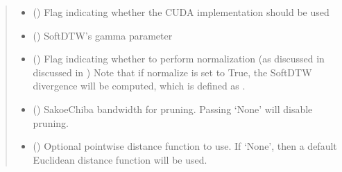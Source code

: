 \documentclass[letterpaper,10pt,english]{sphinxmanual}
\begin{document}
\begin{fulllineitems}
\begin{fulllineitems}
\begin{quote}
\begin{description}
\end{description}\end{quote}

\end{fulllineitems}

\begin{quote}\begin{description}
\begin{itemize}
\item {} 
\sphinxAtStartPar
{} () \textendash{} Flag indicating whether the CUDA implementation should be used

\item {} 
\sphinxAtStartPar
{} () \textendash{} SoftDTW’s gamma parameter

\item {} 
\sphinxAtStartPar
{} () \textendash{} Flag indicating whether to perform normalization (as discussed in discussed in )
Note that if normalize is set to True, the SoftDTW divergence will be computed, which is defined as .

\item {} 
\sphinxAtStartPar
{} () \textendash{} Sakoe\sphinxhyphen{}Chiba bandwidth for pruning. Passing ‘None’ will disable pruning.

\item {} 
\sphinxAtStartPar
{} () \textendash{} Optional point\sphinxhyphen{}wise distance function to use. If ‘None’, then a default Euclidean distance function will be used.

\end{itemize}

\end{description}\end{quote}

\end{fulllineitems}
\end{document}
